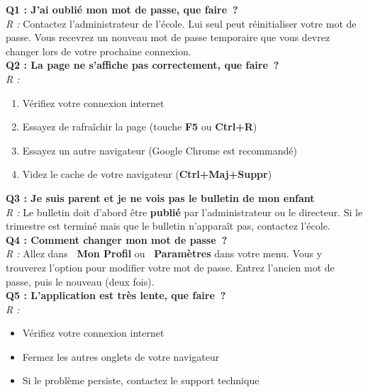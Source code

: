 \documentclass[12pt, a4paper, twoside, openright]{report}
\newcommand{\menu}[1]{\textbf{\textcolor{brandBlue}{\faChevronRight~#1}}}
\begin{document}
\begin{tcolorbox}[colback=bgLight, colframe=brandBlue, rounded corners, title={\faQuestionCircle\quad Questions fréquentes}]

\textbf{Q1 : J'ai oublié mon mot de passe, que faire~?}\\
\textit{R :} Contactez l'administrateur de l'école. Lui seul peut réinitialiser votre mot de passe. Vous recevrez un nouveau mot de passe temporaire que vous devrez changer lors de votre prochaine connexion.\\[8pt]

\textbf{Q2 : La page ne s'affiche pas correctement, que faire~?}\\
\textit{R :} 
\begin{enumerate}[label=\arabic*.]
  \item Vérifiez votre connexion internet
  \item Essayez de rafraîchir la page (touche \textbf{F5} ou \textbf{Ctrl+R})
  \item Essayez un autre navigateur (Google Chrome est recommandé)
  \item Videz le cache de votre navigateur (\textbf{Ctrl+Maj+Suppr})
\end{enumerate}
\vspace{4pt}

\textbf{Q3 : Je suis parent et je ne vois pas le bulletin de mon enfant}\\
\textit{R :} Le bulletin doit d'abord être \textbf{publié} par l'administrateur ou le directeur. Si le trimestre est terminé mais que le bulletin n'apparaît pas, contactez l'école.\\[8pt]

\textbf{Q4 : Comment changer mon mot de passe~?}\\
\textit{R :} Allez dans \menu{Mon Profil} ou \menu{Paramètres} dans votre menu. Vous y trouverez l'option pour modifier votre mot de passe. Entrez l'ancien mot de passe, puis le nouveau (deux fois).\\[8pt]

\textbf{Q5 : L'application est très lente, que faire~?}\\
\textit{R :} 
\begin{itemize}
  \item Vérifiez votre connexion internet
  \item Fermez les autres onglets de votre navigateur
  \item Si le problème persiste, contactez le support technique
\end{itemize}
\vspace{4pt}


\end{tcolorbox}
\end{document}

